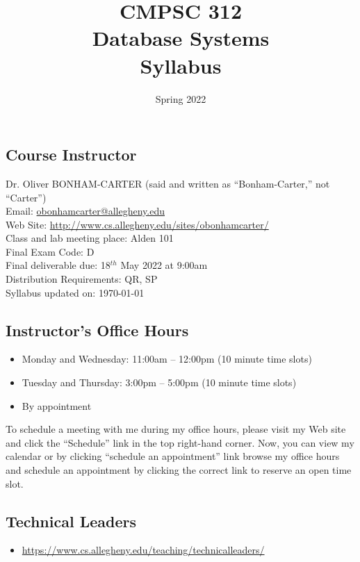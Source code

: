 \documentclass[11pt]{article} %
\title{\textbf{CMPSC 312\\ Database Systems\\Syllabus}}
\author{Spring 2022}
\date{} %
\begin{document}
\maketitle




\subsection*{\textbf{Course Instructor}}
Dr. Oliver BONHAM-CARTER (said and written as ``Bonham-Carter,'' not “Carter'')\\
\noindent Email: \url{obonhamcarter@allegheny.edu} \\
\noindent Web Site: \url{http://www.cs.allegheny.edu/sites/obonhamcarter/} \\
\noindent Class and lab meeting place: Alden 101\\
\noindent Final Exam Code: D\\  
\noindent Final deliverable due: 18$^{th}$ May 2022 at 9:00am\\ %
\noindent Distribution Requirements: QR, SP\\
\noindent Syllabus updated on: \today\\





\subsection*{\textbf{Instructor's Office Hours}}

\begin{itemize}
  \itemsep 0em
  \item Monday and Wednesday: 11:00am -- 12:00pm (10 minute time slots)
  \item Tuesday and Thursday: 3:00pm -- 5:00pm (10 minute time slots)
  \item By appointment
\end{itemize}


\noindent
To schedule a meeting with me during my office hours, please visit my Web site and click the ``Schedule'' link in the top right-hand corner. Now, you can view my calendar or by clicking ``schedule an appointment'' link browse my office hours and schedule an appointment by clicking the correct link to reserve an open time slot. 


\subsection*{\textbf{Technical Leaders}}
	\begin{itemize}
		\item   \url{https://www.cs.allegheny.edu/teaching/technicalleaders/}
	\end{itemize}
\end{document}
